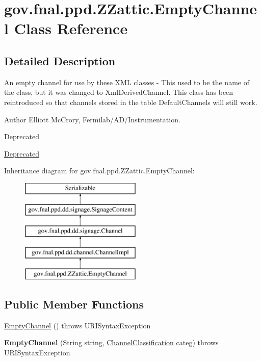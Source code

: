 \hypertarget{classgov_1_1fnal_1_1ppd_1_1ZZattic_1_1EmptyChannel}{\section{gov.\-fnal.\-ppd.\-Z\-Zattic.\-Empty\-Channel Class Reference}
\label{classgov_1_1fnal_1_1ppd_1_1ZZattic_1_1EmptyChannel}
}


\subsection{Detailed Description}
An empty channel for use by these X\-M\-L classes -\/ This used to be the name of the class, but it was changed to Xml\-Derived\-Channel. This class has been reintroduced so that channels stored in the table Default\-Channels will still work.

\begin{DoxyAuthor}{Author}
Elliott Mc\-Crory, Fermilab/\-A\-D/\-Instrumentation.
\end{DoxyAuthor}
\begin{DoxyRefDesc}{Deprecated}
\item[\hyperlink{deprecated__deprecated000009}{Deprecated}]\end{DoxyRefDesc}
Inheritance diagram for gov.\-fnal.\-ppd.\-Z\-Zattic.\-Empty\-Channel\-:\begin{figure}[H]
\begin{center}
\leavevmode
\includegraphics[height=5.000000cm]{classgov_1_1fnal_1_1ppd_1_1ZZattic_1_1EmptyChannel}
\end{center}
\end{figure}
\subsection*{Public Member Functions}
\begin{DoxyCompactItemize}
\item 
\hyperlink{classgov_1_1fnal_1_1ppd_1_1ZZattic_1_1EmptyChannel_a4a6583a1af231f1b744f301b4fd5a189}{Empty\-Channel} ()  throws U\-R\-I\-Syntax\-Exception 
\item 
\hypertarget{classgov_1_1fnal_1_1ppd_1_1ZZattic_1_1EmptyChannel_a0cf129fc587da4f9267aff97fbe33633}{{\bfseries Empty\-Channel} (String string, \hyperlink{classgov_1_1fnal_1_1ppd_1_1dd_1_1changer_1_1ChannelClassification}{Channel\-Classification} categ)  throws U\-R\-I\-Syntax\-Exception }\label{classgov_1_1fnal_1_1ppd_1_1ZZattic_1_1EmptyChannel_a0cf129fc587da4f9267aff97fbe33633}

\end{DoxyCompactItemize}
